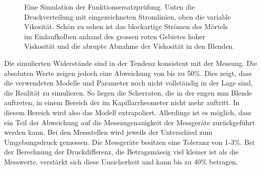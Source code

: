 \begin{figure}[htb]
    \centering
    \caption{Eine Simulation der Funktionsersatzprüfung. Unten die Druckverteilung mit eingezeichneten Stromlinien, oben die variable Vikosität. Schön zu sehen ist das blockartige Strömen des Mörtels im Einlaufkolben anhand des grossen roten Gebietes hoher Viskosität und die abrupte Abnahme der Viskosität in den Blenden.}
    \label{fig:fepSimResult}
\end{figure}

Die simulierten Widerstände sind in der Tendenz konsistent mit der Messung. Die absoluten Werte zeigen jedoch eine Abweichung von bis zu 50\%. Dies zeigt, dass die verwendeten Modelle und Parameter noch nicht vollständig in der Lage sind, die Realität zu simulieren. So liegen die Scherraten, die in der engen \unit[2]{mm} Blende auftreten, in einem Bereich der im Kapillarrheometer nicht mehr auftritt. In diesem Bereich wird also das Modell extrapoliert.
Allerdings ist es möglich, dass ein Teil der Abweichung auf die Messungenauigkeit der Messgeräte zurückgeführt werden kann. 
Bei den Messstellen wird jeweils der Unterschied zum Umgebungsdruck gemessen. Die Messgeräte besitzen eine Toleranz von 1-3\%. 
Bei der Berechnung der Druckdifferenz, die Betragsmässig viel kleiner ist als die Messwerte, verstärkt sich diese Unsicherheit und kann bis zu 40\% betragen.
%
